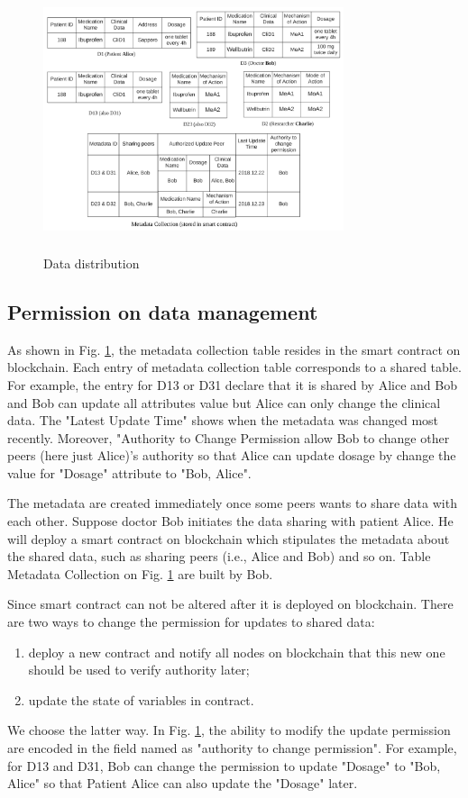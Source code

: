 \documentclass[conference]{IEEEtran}
\begin{document}
\begin{figure}[htbp]
	\centerline{\includegraphics[width=250pt,height=220pt]{medicalData.png}}
	\caption{Data distribution}
	\label{dataRepresentation}
\end{figure}


\subsection{Permission on data management}

As shown in Fig. \ref{dataRepresentation}, the metadata collection table resides in the smart contract on blockchain. Each entry of metadata collection table corresponds to a shared table. For example, the entry for D13 or D31 declare that it is shared by Alice and Bob and Bob can update all attributes value but Alice can only change the clinical data. The "Latest Update Time" shows when the metadata was changed most recently. Moreover, "Authority to Change Permission allow Bob to change other peers (here just Alice)'s authority so that Alice can update dosage by change the value for "Dosage" attribute to "Bob, Alice".

The metadata are created immediately once some peers wants to share data with each other. Suppose doctor Bob initiates the data sharing with patient Alice. He will deploy a smart contract on blockchain which stipulates the metadata about the shared data, such as sharing peers (i.e., Alice and Bob) and so on.  Table Metadata Collection on Fig. \ref{dataRepresentation} are built by Bob. 

Since smart contract can not be altered after it is deployed on blockchain. There are two ways to change the permission for updates to shared data:
\begin{enumerate}
	\item deploy a new contract and notify all nodes on blockchain that this new one should be used to verify authority later;
	\item update the state of variables in contract.
\end{enumerate}
We choose the latter way. In Fig. \ref{dataRepresentation}, the ability to modify the update permission are encoded in the field named as "authority to change permission". For example, for D13 and D31, Bob can change the permission to update "Dosage" to "Bob, Alice" so that Patient Alice can also update the  "Dosage" later.
\end{document}
